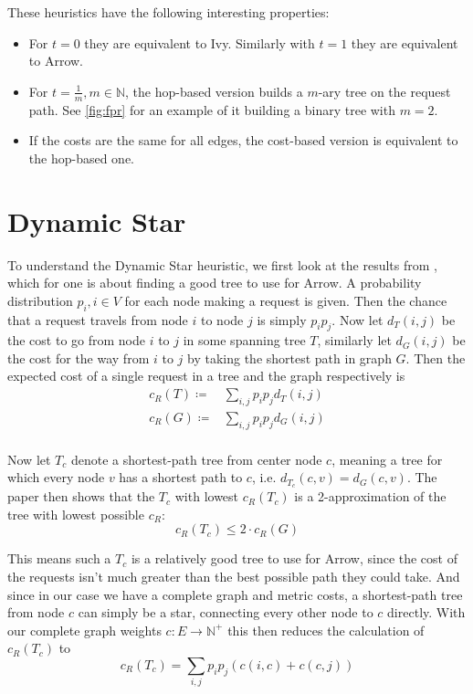 \documentclass[a4paper, oneside]{discothesis}
\begin{document}
These heuristics have the following interesting properties:
\begin{itemize}
\item For $t=0$ they are equivalent to Ivy. Similarly with $t=1$ they are equivalent to Arrow.
\item For $t=\frac{1}{m}, m\in\mathbb{N}$, the hop-based version builds a $m$-ary tree on the request path. See \autoref{fig:fpr} for an example of it building a binary tree with $m=2$.
\item If the costs are the same for all edges, the cost-based version is equivalent to the hop-based one.
\end{itemize}

\section{Dynamic Star}
\label{alg:dynstar}

To understand the Dynamic Star heuristic, we first look at the results from \cite{Peleg}, which for one is about finding a good tree to use for Arrow. A probability distribution $p_i, i\in V$ for each node making a request is given. Then the chance that a request travels from node $i$ to node $j$ is simply $p_ip_j$. Now let $d_T(i,j)$ be the cost to go from node $i$ to $j$ in some spanning tree $T$, similarly let $d_G(i,j)$ be the cost for the way from $i$ to $j$ by taking the shortest path in graph $G$. Then the expected cost of a single request in a tree and the graph respectively is
\begin{equation}
\begin{split}
c_R(T)\coloneqq & \sum_{i,j}p_ip_jd_T(i,j) \\
c_R(G)\coloneqq & \sum_{i,j}p_ip_jd_G(i,j) \\
\end{split}
\end{equation}

Now let $T_c$ denote a shortest-path tree from center node $c$, meaning a tree for which every node $v$ has a shortest path to $c$, i.e. $d_{T_c}(c,v)=d_G(c,v)$. The paper then shows that the $T_c$ with lowest $c_R(T_c)$ is a 2-approximation of the tree with lowest possible $c_R$:
\begin{equation}
c_R(T_c)\leq 2\cdot c_R(G)
\end{equation}

This means such a $T_c$ is a relatively good tree to use for Arrow, since the cost of the requests isn't much greater than the best possible path they could take. And since in our case we have a complete graph and metric costs, a shortest-path tree from node $c$ can simply be a star, connecting every other node to $c$ directly. With our complete graph weights $c:E\to\mathbb{N}^+$ this then reduces the calculation of $c_R(T_c)$ to
\begin{equation}
\label{dynstarc}
c_R(T_c)=\sum_{i,j}p_ip_j(c(i,c)+c(c,j))
\end{equation}
\end{document}
